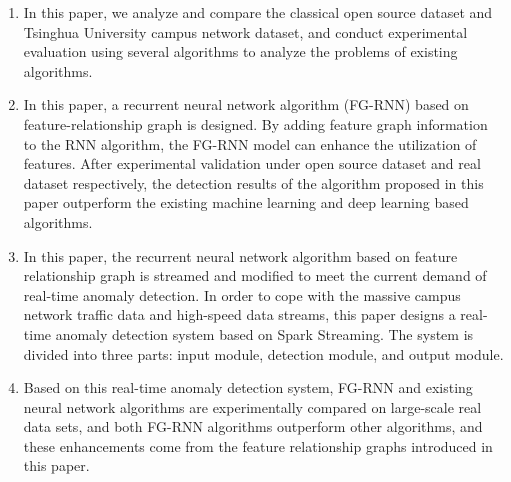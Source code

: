 \begin{abstract*}
  \begin{enumerate}
    \item In this paper, we analyze and compare the classical open source dataset and Tsinghua University campus network dataset, and conduct experimental evaluation using several algorithms to analyze the problems of existing algorithms.
    \item In this paper, a recurrent neural network algorithm (FG-RNN) based on feature-relationship graph is designed. By adding feature graph information to the RNN algorithm, the FG-RNN model can enhance the utilization of features. After experimental validation under open source dataset and real dataset respectively, the detection results of the algorithm proposed in this paper outperform the existing machine learning and deep learning based algorithms.
    \item In this paper, the recurrent neural network algorithm based on feature relationship graph is streamed and modified to meet the current demand of real-time anomaly detection. In order to cope with the massive campus network traffic data and high-speed data streams, this paper designs a real-time anomaly detection system based on Spark Streaming. The system is divided into three parts: input module, detection module, and output module.
    \item Based on this real-time anomaly detection system, FG-RNN and existing neural network algorithms are experimentally compared on large-scale real data sets, and both FG-RNN algorithms outperform other algorithms, and these enhancements come from the feature relationship graphs introduced in this paper.
  \end{enumerate}



\end{abstract*}
